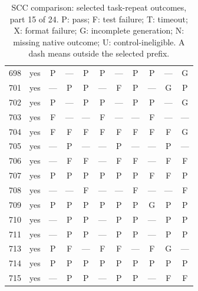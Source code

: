 \begin{table}[p]
\begin{tabular*}{\textwidth}{@{\extracolsep{\fill}}rc*{9}{c}@{}}
698 & yes & P & — & P & P & — & P & P & — & G\\
701 & yes & — & P & P & — & F & P & — & G & P\\
702 & yes & P & — & P & P & — & P & P & — & G\\
703 & yes & F & — & — & F & — & — & F & — & —\\
704 & yes & F & F & F & F & F & F & F & F & G\\
705 & yes & — & P & — & — & P & — & — & P & —\\
706 & yes & — & F & F & — & F & F & — & F & F\\
707 & yes & P & P & P & P & P & P & F & F & P\\
708 & yes & — & — & F & — & — & F & — & — & F\\
709 & yes & P & P & P & P & P & P & G & P & P\\
710 & yes & — & P & P & — & P & P & — & P & P\\
711 & yes & — & P & P & — & P & P & — & P & P\\
713 & yes & P & F & — & F & F & — & F & G & —\\
714 & yes & P & P & P & P & P & P & P & P & P\\
715 & yes & — & P & P & — & P & P & — & F & F\\
\bottomrule\end{tabular*}
\caption{SCC comparison: selected task-repeat outcomes, part 15 of 24. P: pass; F: test failure; T: timeout; X: format failure; G: incomplete generation; N: missing native outcome; U: control-ineligible. A dash means outside the selected prefix.}
\end{table}
\clearpage
